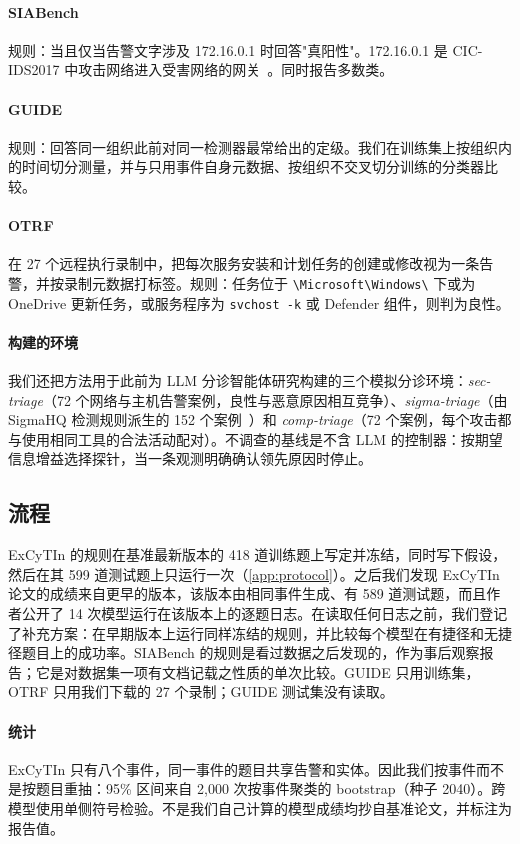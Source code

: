 \paragraph{SIABench} 规则：当且仅当告警文字涉及 172.16.0.1 时回答"真阳性"。172.16.0.1 是 CIC-IDS2017 中攻击网络进入受害网络的网关~\citep{cicids2017}。同时报告多数类。

\paragraph{GUIDE} 规则：回答同一组织此前对同一检测器最常给出的定级。我们在训练集上按组织内的时间切分测量，并与只用事件自身元数据、按组织不交叉切分训练的分类器比较。

\paragraph{OTRF} 在 27 个远程执行录制中，把每次服务安装和计划任务的创建或修改视为一条告警，并按录制元数据打标签。规则：任务位于 \texttt{\textbackslash Microsoft\textbackslash Windows\textbackslash} 下或为 OneDrive 更新任务，或服务程序为 \texttt{svchost -k} 或 Defender 组件，则判为良性。

\paragraph{构建的环境} 我们还把方法用于此前为 LLM 分诊智能体研究构建的三个模拟分诊环境：\emph{sec-triage}（72 个网络与主机告警案例，良性与恶意原因相互竞争）、\emph{sigma-triage}（由 SigmaHQ 检测规则派生的 152 个案例~\citep{sigmahq}）和 \emph{comp-triage}（72 个案例，每个攻击都与使用相同工具的合法活动配对）。不调查的基线是不含 LLM 的控制器：按期望信息增益选择探针，当一条观测明确确认领先原因时停止。

\subsection{流程}
\label{sec:protocol}

ExCyTIn 的规则在基准最新版本的 418 道训练题上写定并冻结，同时写下假设，然后在其 599 道测试题上只运行一次（\cref{app:protocol}）。之后我们发现 ExCyTIn 论文的成绩来自更早的版本，该版本由相同事件生成、有 589 道测试题，而且作者公开了 14 次模型运行在该版本上的逐题日志。在读取任何日志之前，我们登记了补充方案：在早期版本上运行同样冻结的规则，并比较每个模型在有捷径和无捷径题目上的成功率。SIABench 的规则是看过数据之后发现的，作为事后观察报告；它是对数据集一项有文档记载之性质的单次比较。GUIDE 只用训练集，OTRF 只用我们下载的 27 个录制；GUIDE 测试集没有读取。

\paragraph{统计} ExCyTIn 只有八个事件，同一事件的题目共享告警和实体。因此我们按事件而不是按题目重抽：95\% 区间来自 2{,}000 次按事件聚类的 bootstrap（种子 2040）。跨模型使用单侧符号检验。不是我们自己计算的模型成绩均抄自基准论文，并标注为报告值。
